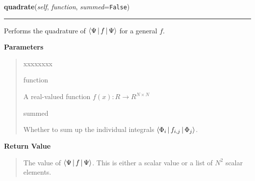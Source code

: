    \vspace{0.5ex}

\hspace{.8\funcindent}\begin{boxedminipage}{\funcwidth}

    \raggedright \textbf{quadrate}(\textit{self}, \textit{function}, \textit{summed}={\tt False})

    \vspace{-1.5ex}

    \rule{\textwidth}{0.5\fboxrule}
\setlength{\parskip}{2ex}
    Performs the quadrature of
    $\Braket{\Psi|f|\Psi}$
    for a general $f$.

\setlength{\parskip}{1ex}
      \textbf{Parameters}
      \vspace{-1ex}

      \begin{quote}
        \begin{Ventry}{xxxxxxxx}

          \item[function]

          A real-valued function $f(x):R \rightarrow R^{N
          \times N}$

          \item[summed]

          Whether to sum up the individual integrals
          $\Braket{\Phi_i|f_{i,j}|\Phi_j}$.

        \end{Ventry}

      \end{quote}

      \textbf{Return Value}
    \vspace{-1ex}

      \begin{quote}
      The value of
      $\Braket{\Psi|f|\Psi}$.
      This is either a scalar value or a list of $N^2$
      scalar elements.

      \end{quote}

    \end{boxedminipage}

    \label{HagedornWavepacket:HagedornWavepacket:matrix}

    \vspace{0.5ex}

